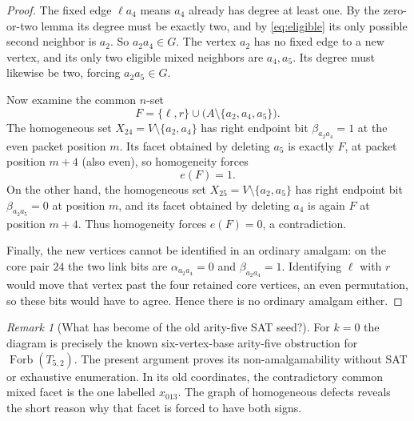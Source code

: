 \documentclass[11pt,a4paper]{article}
\theoremstyle{remark}
\newtheorem{remark}[theorem]{Remark}
\begin{document}
\begin{proof}
The fixed edge $\ell a_4$ means $a_4$ already has degree at least one.
By the zero-or-two lemma its degree must be exactly two, and by
\eqref{eq:eligible} its only possible second neighbor is $a_2$.
So $a_2a_4\in G$. The vertex $a_2$ has no fixed edge to a new
vertex, and its only two eligible mixed neighbors are $a_4,a_5$.
Its degree must likewise be two, forcing $a_2a_5\in G$.

Now examine the common $n$-set
\[
 F=\{\ell,r\}\cup\bigl(A\setminus\{a_2,a_4,a_5\}\bigr).
\]
The homogeneous set $X_{24}=V\setminus\{a_2,a_4\}$ has right
endpoint bit $\beta_{a_2a_4}=1$ at the even packet position $m$.
Its facet obtained by deleting $a_5$ is exactly $F$, at packet
position $m+4$ (also even), so homogeneity forces
\[
 e(F)=1.
\]
On the other hand, the homogeneous set
$X_{25}=V\setminus\{a_2,a_5\}$ has right endpoint bit
$\beta_{a_2a_5}=0$ at position $m$, and its facet obtained by
deleting $a_4$ is again $F$ at position $m+4$. Thus homogeneity
forces $e(F)=0$, a contradiction.

Finally, the new vertices cannot be identified in an ordinary
amalgam: on the core pair $24$ the two link bits are
$\alpha_{a_2a_4}=0$ and $\beta_{a_2a_4}=1$. Identifying
$\ell$ with $r$ would move that vertex past the four retained
core vertices, an even permutation, so these bits would have to
agree. Hence there is no ordinary amalgam either.
\end{proof}

\begin{remark}[What has become of the old arity-five SAT seed?]
For $k=0$ the diagram is precisely the known six-vertex-base
arity-five obstruction for $\operatorname{Forb}(T_{5,2})$.
The present argument proves its non-amalgamability without SAT or
exhaustive enumeration. In its old coordinates, the contradictory
common mixed facet is the one labelled $x_{013}$.
The graph of homogeneous defects reveals the short reason why that
facet is forced to have both signs.
\end{remark}
\end{document}
